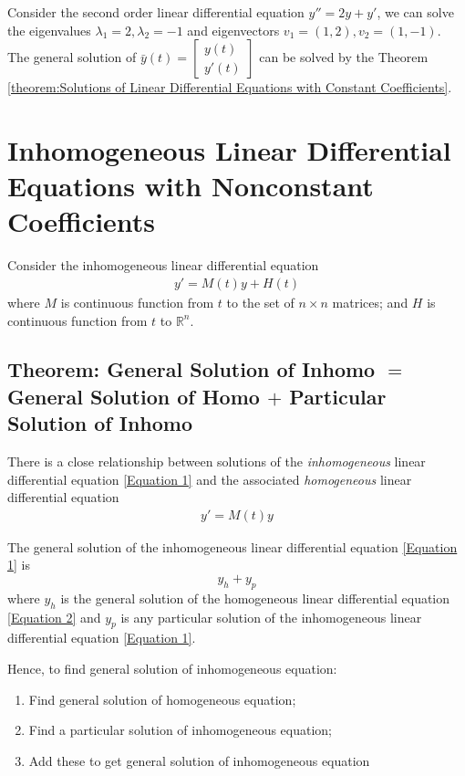\documentclass[11pt]{elegantbook}
\begin{document}
\begin{example}
    Consider the second order linear differential equation $y''=2y+y'$, we can solve the eigenvalues $\lambda_1=2,\lambda_2=-1$ and eigenvectors $v_1=(1,2), v_2=(1,-1)$. The general solution of $\bar{y}(t)=\begin{bmatrix}
        y(t)\\ y'(t)
    \end{bmatrix}$ can be solved by the Theorem \ref{theorem:Solutions of Linear Differential Equations with Constant Coefficients}.
\end{example}

\section{Inhomogeneous Linear Differential Equations with Nonconstant Coefficients}
Consider the inhomogeneous linear differential equation
\begin{equation}
    \begin{aligned}
        y'=M(t)y+H(t)
    \end{aligned}
    \tag{1}
    \label{Equation 1}
\end{equation}
where $M$ is continuous function from $t$ to the set of $n \times n$ matrices; and $H$ is continuous
function from $t$ to $\mathbb{R}^n$.

\subsection{Theorem: General Solution of Inhomo $=$ General Solution of Homo $+$ Particular Solution of Inhomo}
There is a close relationship between solutions of the \textit{inhomogeneous} linear differential equation \ref{Equation 1} and the associated \textit{homogeneous} linear differential equation
\begin{equation}
    \begin{aligned}
        y'=M(t)y
    \end{aligned}
    \tag{2}
    \label{Equation 2}
\end{equation}

\begin{theorem}[General Solution of Inhomo $=$ General Solution of Homo $+$ Particular Solution of Inhomo]
    The general solution of the inhomogeneous linear differential equation \ref{Equation 1} is $$y_h+y_p$$
    where $y_h$ is the general solution of the homogeneous linear differential equation \ref{Equation 2} and $y_p$ is any particular solution of the inhomogeneous linear differential equation \ref{Equation 1}.
\end{theorem}
Hence, to find general solution of inhomogeneous equation:
\begin{enumerate}
    \item Find general solution of homogeneous equation;
    \item Find a particular solution of inhomogeneous equation;
    \item Add these to get general solution of inhomogeneous equation
\end{enumerate}
\end{document}
